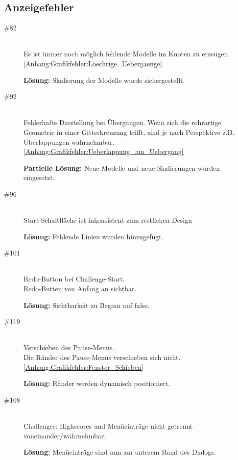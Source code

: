 %



\clearpage



\subsection*{Anzeigefehler}



\begin{description}


\item[\#82] \hfill \\
Es ist immer noch möglich \glqq fehlende Modelle im Knoten zu erzeugen\grqq. \ref{Anhang:Grafikfehler:Loechrige_Uebergaenge}

{\bfseries Lösung:} Skalierung der Modelle wurde sichergestellt.


\item[\#92] \hfill \\
Fehlerhafte Darstellung bei Übergängen. Wenn sich die rohrartige Geometrie in einer Gitterkreuzung trifft, sind je nach Perspektive z.B. Überlappungen wahrnehmbar. \ref{Anhang:Grafikfehler:Ueberlappung_am_Uebergang}

{\bfseries Partielle Lösung:} Neue Modelle und neue Skalierungen wurden eingesetzt.


\item[\#96] \hfill \\
\glqq Start\grqq-Schaltfläche ist inkonsistent zum restlichen Design

{\bfseries Lösung:} Fehlende Linien wurden hinzugefügt.


\item[\#101] \hfill \\
Redo-Button bei Challenge-Start.\\
Redo-Butten von Anfang an sichtbar.
 
{\bfseries Lösung:} Sichtbarkeit zu Beginn auf \glqq false\grqq.


\item[\#119] \hfill \\
Verschieben des Pause-Menüs. \\
Die Ränder des Pause-Menüs verschieben sich nicht. \ref{Anhang:Grafikfehler:Fenster_Schieben}

{\bfseries Lösung:} Ränder werden dynamisch positioniert. 


\item[\#108] \hfill \\
Challenges: Highscores und Menüeinträge nicht getrennt voneinander/wahrnehmbar.
 
{\bfseries Lösung:} Menüeinträge sind nun am unterem Rand des Dialogs.
 
 
\end{description}



~\\


